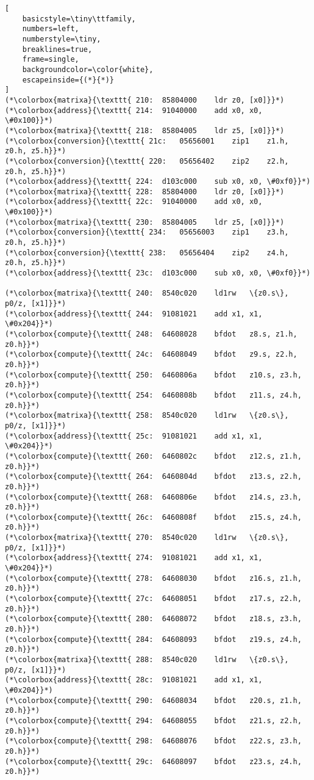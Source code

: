 \documentclass[a4paper,10pt]{article}
\begin{document}
\begin{lstlisting}[
    basicstyle=\tiny\ttfamily,
    numbers=left,
    numberstyle=\tiny,
    breaklines=true,
    frame=single,
    backgroundcolor=\color{white},
    escapeinside={(*}{*)}
]
(*\colorbox{matrixa}{\texttt{ 210:	85804000 	ldr	z0, [x0]}}*)
(*\colorbox{address}{\texttt{ 214:	91040000 	add	x0, x0, \#0x100}}*)
(*\colorbox{matrixa}{\texttt{ 218:	85804005 	ldr	z5, [x0]}}*)
(*\colorbox{conversion}{\texttt{ 21c:	05656001 	zip1	z1.h, z0.h, z5.h}}*)
(*\colorbox{conversion}{\texttt{ 220:	05656402 	zip2	z2.h, z0.h, z5.h}}*)
(*\colorbox{address}{\texttt{ 224:	d103c000 	sub	x0, x0, \#0xf0}}*)
(*\colorbox{matrixa}{\texttt{ 228:	85804000 	ldr	z0, [x0]}}*)
(*\colorbox{address}{\texttt{ 22c:	91040000 	add	x0, x0, \#0x100}}*)
(*\colorbox{matrixa}{\texttt{ 230:	85804005 	ldr	z5, [x0]}}*)
(*\colorbox{conversion}{\texttt{ 234:	05656003 	zip1	z3.h, z0.h, z5.h}}*)
(*\colorbox{conversion}{\texttt{ 238:	05656404 	zip2	z4.h, z0.h, z5.h}}*)
(*\colorbox{address}{\texttt{ 23c:	d103c000 	sub	x0, x0, \#0xf0}}*)

(*\colorbox{matrixa}{\texttt{ 240:	8540c020 	ld1rw	\{z0.s\}, p0/z, [x1]}}*)
(*\colorbox{address}{\texttt{ 244:	91081021 	add	x1, x1, \#0x204}}*)
(*\colorbox{compute}{\texttt{ 248:	64608028 	bfdot	z8.s, z1.h, z0.h}}*)
(*\colorbox{compute}{\texttt{ 24c:	64608049 	bfdot	z9.s, z2.h, z0.h}}*)
(*\colorbox{compute}{\texttt{ 250:	6460806a 	bfdot	z10.s, z3.h, z0.h}}*)
(*\colorbox{compute}{\texttt{ 254:	6460808b 	bfdot	z11.s, z4.h, z0.h}}*)
(*\colorbox{matrixa}{\texttt{ 258:	8540c020 	ld1rw	\{z0.s\}, p0/z, [x1]}}*)
(*\colorbox{address}{\texttt{ 25c:	91081021 	add	x1, x1, \#0x204}}*)
(*\colorbox{compute}{\texttt{ 260:	6460802c 	bfdot	z12.s, z1.h, z0.h}}*)
(*\colorbox{compute}{\texttt{ 264:	6460804d 	bfdot	z13.s, z2.h, z0.h}}*)
(*\colorbox{compute}{\texttt{ 268:	6460806e 	bfdot	z14.s, z3.h, z0.h}}*)
(*\colorbox{compute}{\texttt{ 26c:	6460808f 	bfdot	z15.s, z4.h, z0.h}}*)
(*\colorbox{matrixa}{\texttt{ 270:	8540c020 	ld1rw	\{z0.s\}, p0/z, [x1]}}*)
(*\colorbox{address}{\texttt{ 274:	91081021 	add	x1, x1, \#0x204}}*)
(*\colorbox{compute}{\texttt{ 278:	64608030 	bfdot	z16.s, z1.h, z0.h}}*)
(*\colorbox{compute}{\texttt{ 27c:	64608051 	bfdot	z17.s, z2.h, z0.h}}*)
(*\colorbox{compute}{\texttt{ 280:	64608072 	bfdot	z18.s, z3.h, z0.h}}*)
(*\colorbox{compute}{\texttt{ 284:	64608093 	bfdot	z19.s, z4.h, z0.h}}*)
(*\colorbox{matrixa}{\texttt{ 288:	8540c020 	ld1rw	\{z0.s\}, p0/z, [x1]}}*)
(*\colorbox{address}{\texttt{ 28c:	91081021 	add	x1, x1, \#0x204}}*)
(*\colorbox{compute}{\texttt{ 290:	64608034 	bfdot	z20.s, z1.h, z0.h}}*)
(*\colorbox{compute}{\texttt{ 294:	64608055 	bfdot	z21.s, z2.h, z0.h}}*)
(*\colorbox{compute}{\texttt{ 298:	64608076 	bfdot	z22.s, z3.h, z0.h}}*)
(*\colorbox{compute}{\texttt{ 29c:	64608097 	bfdot	z23.s, z4.h, z0.h}}*)

\end{lstlisting}
\end{document}
